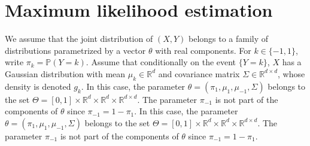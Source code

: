 \documentclass[a4paper,10pt,fleqn]{article}
\newcommand{\rset}{\ensuremath{\mathbb{R}}}
\newcommand{\bP}{\mathbb{P}}
\newcommand{\1}{\ensuremath{\mathbbm{1}}}
\begin{document}
\section{Maximum likelihood estimation}
We assume that the joint distribution of $(X,Y)$ belongs to a family of distributions parametrized by a vector $\theta$ with real components. For $k\in\{-1,1\}$, write $\pi_k = \bP(Y = k)$. Assume that conditionally on the event $\{Y = k\}$, $X$ has a Gaussian distribution with mean $\mu_k \in\rset^d$ and covariance matrix $\Sigma\in \rset^{d\times d}$, whose density is denoted $g_k$. In this case, the parameter $\theta=(\pi_1, \mu_1,\mu_{-1}, \Sigma)$ belongs to the set $\Theta= [0,1] \times \rset^d \times \rset^d \times \rset^{d \times d}$. The parameter $\pi_{-1}$ is not part of the components of $\theta$ since $\pi_{-1}=1-\pi_{1}$. In this case, the parameter $\theta=(\pi_1, \mu_1,\mu_{-1}, \Sigma)$ belongs to the set $\Theta= [0,1] \times \mathbb{R}^d \times \mathbb{R}^d \times \mathbb{R}^{d \times d}$. The parameter $\pi_{-1}$ is not part of the components of $\theta$ since $\pi_{-1}=1-\pi_{1}$. 
\end{document}
